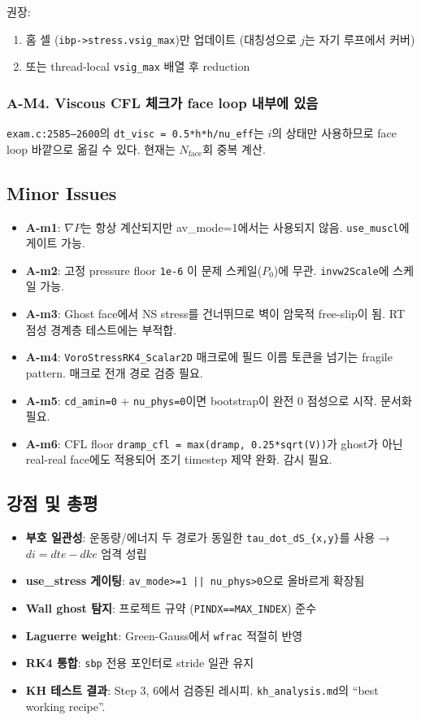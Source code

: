 \documentclass[11pt]{article}
\begin{document}
권장:
\begin{enumerate}
  \item 홈 셀 (\texttt{ibp->stress.vsig\_max})만 업데이트 (대칭성으로 $j$는 자기 루프에서 커버)
  \item 또는 thread-local \texttt{vsig\_max} 배열 후 reduction
\end{enumerate}

\subsubsection*{A-M4. Viscous CFL 체크가 face loop 내부에 있음}
\texttt{exam.c:2585--2600}의 \texttt{dt\_visc = 0.5*h*h/nu\_eff}는 $i$의 상태만 사용하므로
face loop 바깥으로 옮길 수 있다. 현재는 $N_\mathrm{face}$회 중복 계산.

\subsection{Minor Issues}

\begin{itemize}
  \item \textbf{A-m1}: $\nabla P$는 항상 계산되지만 av\_mode=1에서는 사용되지 않음. \texttt{use\_muscl}에 게이트 가능.
  \item \textbf{A-m2}: 고정 pressure floor \texttt{1e-6} 이 문제 스케일($P_0$)에 무관. \texttt{invw2Scale}에 스케일 가능.
  \item \textbf{A-m3}: Ghost face에서 NS stress를 건너뛰므로 벽이 암묵적 free-slip이 됨. RT 점성 경계층 테스트에는 부적합.
  \item \textbf{A-m4}: \texttt{VoroStressRK4\_Scalar2D} 매크로에 필드 이름 토큰을 넘기는 fragile pattern. 매크로 전개 경로 검증 필요.
  \item \textbf{A-m5}: \texttt{cd\_amin=0} + \texttt{nu\_phys=0}이면 bootstrap이 완전 0 점성으로 시작. 문서화 필요.
  \item \textbf{A-m6}: CFL floor \texttt{dramp\_cfl = max(dramp, 0.25*sqrt(V))}가 ghost가 아닌 real-real face에도 적용되어 조기 timestep 제약 완화. 감시 필요.
\end{itemize}

\subsection{강점 및 총평}
\begin{itemize}
  \item \textbf{부호 일관성}: 운동량/에너지 두 경로가 동일한 \texttt{tau\_dot\_dS\_\{x,y\}}를 사용 → $di = dte - dke$ 엄격 성립
  \item \textbf{use\_stress 게이팅}: \texttt{av\_mode>=1 || nu\_phys>0}으로 올바르게 확장됨
  \item \textbf{Wall ghost 탐지}: 프로젝트 규약 (\texttt{PINDX==MAX\_INDEX}) 준수
  \item \textbf{Laguerre weight}: Green-Gauss에서 \texttt{wfrac} 적절히 반영
  \item \textbf{RK4 통합}: \texttt{sbp} 전용 포인터로 stride 일관 유지
  \item \textbf{KH 테스트 결과}: Step 3, 6에서 검증된 레시피. \texttt{kh\_analysis.md}의 ``best working recipe''.
\end{itemize}
\end{document}
